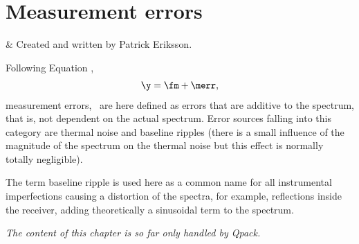 \graphicspath{{Figs/measerr/}}
%
%
\chapter{Measurement errors}


%
%
 & Created and written by Patrick Eriksson.\\
\stophistory


%
%
%



%
%
Following Equation ,
\begin{eqnarray}
   \y = \fm + \merr, \nonumber
\end{eqnarray}
measurement errors, \merr\, are here defined as errors that are
additive to the spectrum, that is, not dependent on the actual spectrum.
Error sources falling into this category are thermal noise and
baseline ripples (there is a small influence of the magnitude of the
spectrum on the thermal noise but this effect is normally totally
negligible).

The term baseline ripple is used here as a common name for all instrumental
imperfections causing a distortion of the spectra, for example,
reflections inside the receiver, adding theoretically a sinusoidal term
to the spectrum.

{\it The content of this chapter is so far only handled by Qpack.}


